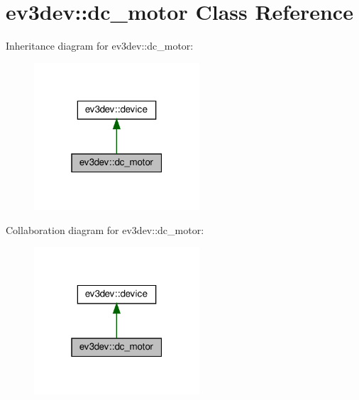 \hypertarget{classev3dev_1_1dc__motor}{}\section{ev3dev\+:\+:dc\+\_\+motor Class Reference}
\label{classev3dev_1_1dc__motor}


Inheritance diagram for ev3dev\+:\+:dc\+\_\+motor\+:
\nopagebreak
\begin{figure}[H]
\begin{center}
\leavevmode
\includegraphics[width=175pt]{classev3dev_1_1dc__motor__inherit__graph}
\end{center}
\end{figure}


Collaboration diagram for ev3dev\+:\+:dc\+\_\+motor\+:
\nopagebreak
\begin{figure}[H]
\begin{center}
\leavevmode
\includegraphics[width=175pt]{classev3dev_1_1dc__motor__coll__graph}
\end{center}
\end{figure}
